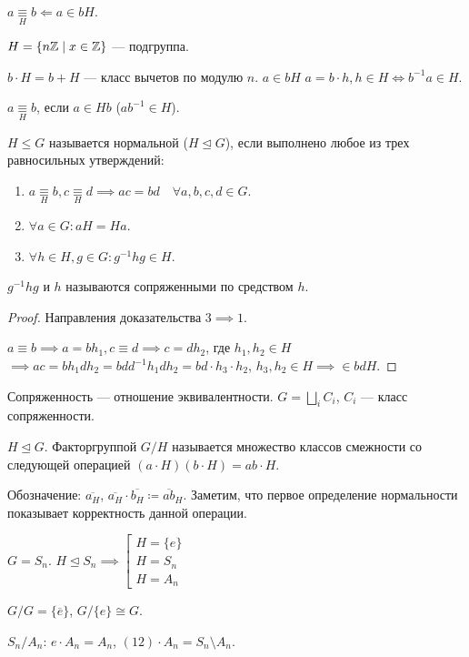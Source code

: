 \begin{definition}
    $a \underset{H}{\equiv} b \Leftarrow a \in bH$.
\end{definition}
\begin{example}
   $H = \{ n\mathbb{Z} \mid x\in \mathbb{Z}\}$ --- подгруппа.  

   $b \cdot H = b + H$ --- класс вычетов по модулю  $n$. $a \in bH$  $a = b\cdot h, h \in H \iff b^{-1}a \in H$.

   $a \underset{H}{\equiv}b$, если  $a \in Hb$ ($ab^{-1} \in H$).
\end{example}
\begin{definition}
    $H \le G$ называется нормальной ($H \trianglelefteq G$), если выполнено любое из трех равносильных утверждений:
    \begin{enumerate}
        \item $a \underset{H}{\equiv} b, c \underset{H}{\equiv} d \implies ac = bd \quad \forall a,b,c,d \in G$.
        \item $\forall a \in G\!: aH=Ha$.
        \item  $\forall h \in H, g \in G\!: g^{-1}hg \in H$.
    \end{enumerate}
\end{definition}
\begin{definition}
    $g^{-1}hg$ и  $h$ называются сопряженными по средством  $h$.
\end{definition}
\begin{proof}
    Направления доказательства $3 \implies 1$.

     $a \equiv b \implies a = bh_1, c \equiv d \implies c = dh_2$, где $h_1, h_2 \in H$ $\implies ac = bh_1dh_2 = bdd^{-1}h_1dh_2 = bd \cdot h_3 \cdot h_2$, $h_3, h_2 \in H \implies \in bdH$.
\end{proof}
\begin{remark}
    Сопряженность --- отношение эквивалентности.
    $G = \bigsqcup\limits_i C_i$,  $C_i$ --- класс сопряженности.
\end{remark}
\begin{definition}
    $H \trianglelefteq G$. Факторгруппой  $G / H$ называется множество классов смежности со следующей операцией $(a\cdot H)(b\cdot H) = ab \cdot H$.

    Обозначение: $\overline{a_H}$,  $\overline{a_H} \cdot \overline{b_H} \coloneqq \overline{ab}_H$. Заметим, что первое определение нормальности показывает корректность данной операции.
\end{definition}
\begin{example}
    $G = S_n$.  $H \trianglelefteq S_n \implies \left[ \begin{array}{l} H = \{e\} \\ H = S_n \\ H = A_n \end{array} \right.$

     $G / G = \{ \overline{e} \}$,  $G / \{e\} \cong G$. 

     $S_n / A_n$:  $e \cdot A_n = A_n$,  $(12) \cdot A_n = S_n \setminus A_n$.
\end{example}

